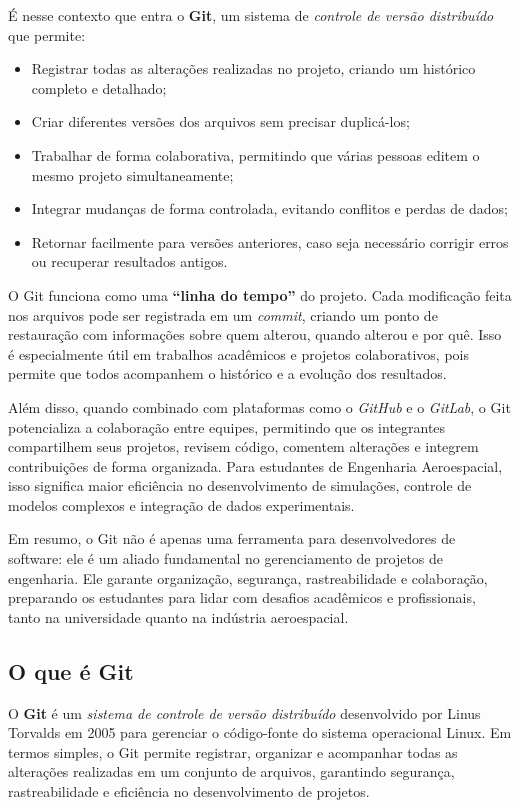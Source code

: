É nesse contexto que entra o \textbf{Git}, um sistema de \textit{controle de versão distribuído} que permite:

\begin{itemize}
    \item Registrar todas as alterações realizadas no projeto, criando um histórico completo e detalhado;
    \item Criar diferentes versões dos arquivos sem precisar duplicá-los;
    \item Trabalhar de forma colaborativa, permitindo que várias pessoas editem o mesmo projeto simultaneamente;
    \item Integrar mudanças de forma controlada, evitando conflitos e perdas de dados;
    \item Retornar facilmente para versões anteriores, caso seja necessário corrigir erros ou recuperar resultados antigos.
\end{itemize}

O Git funciona como uma \textbf{“linha do tempo”} do projeto. Cada modificação feita nos arquivos pode ser registrada em um \textit{commit}, criando um ponto de restauração com informações sobre quem alterou, quando alterou e por quê. Isso é especialmente útil em trabalhos acadêmicos e projetos colaborativos, pois permite que todos acompanhem o histórico e a evolução dos resultados.

Além disso, quando combinado com plataformas como o \textit{GitHub} e o \textit{GitLab}, o Git potencializa a colaboração entre equipes, permitindo que os integrantes compartilhem seus projetos, revisem código, comentem alterações e integrem contribuições de forma organizada. Para estudantes de Engenharia Aeroespacial, isso significa maior eficiência no desenvolvimento de simulações, controle de modelos complexos e integração de dados experimentais.

Em resumo, o Git não é apenas uma ferramenta para desenvolvedores de software: ele é um aliado fundamental no gerenciamento de projetos de engenharia. Ele garante organização, segurança, rastreabilidade e colaboração, preparando os estudantes para lidar com desafios acadêmicos e profissionais, tanto na universidade quanto na indústria aeroespacial.

\subsection{O que é Git}

O \textbf{Git} é um \textit{sistema de controle de versão distribuído} desenvolvido por Linus Torvalds em 2005 para gerenciar o código-fonte do sistema operacional Linux. Em termos simples, o Git permite registrar, organizar e acompanhar todas as alterações realizadas em um conjunto de arquivos, garantindo segurança, rastreabilidade e eficiência no desenvolvimento de projetos.

